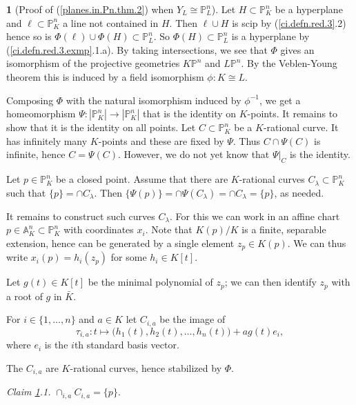 \documentclass{amsart}
\theoremstyle{definition}
\newtheorem{say}[thm]{}
\theoremstyle{remark}
\renewcommand{\a}[0]{{\mathbb A}}
\newcommand{\p}[0]{{\mathbb P}}
\begin{document}
\begin{say}[Proof of (\ref{planes.in.Pn.thm.2}) when $Y_L\cong \p^n_L$]\label{planes.in.Pn.thm.pf.1} Let $H\subset \p^n_K$ be a hyperplane and
 $\ell\subset \p^n_K$  a line not contained in $H$. Then
$\ell\cup H$ is scip by (\ref{ci.defn.red.3}.2) hence
so is $\Phi(\ell)\cup \Phi(H)\subset \p^n_L$. So 
$\Phi(H)\subset \p^n_L$ is a hyperplane
by (\ref{ci.defn.red.3.exmp}.1.a). By taking intersections, we see that
$\Phi$ gives an isomorphism of the projective geometries
$K\p^n$ and $L\p^n$. By  the Veblen-Young theorem \cite{MR1506049}
this is induced by a field  isomorphism $\phi:K\cong L$.


Composing $\Phi$ with the natural isomorphism induced by $\phi^{-1}$,
we get a homeomorphism $\Psi:|\p^n_K|\to |\p^n_K|$ that is the identity on $K$-points. It remains to show that it is the identity on all points. 
Let $C\subset \p^n_K$ be a $K$-rational curve. It has infinitely many $K$-points and these are fixed by $\Psi$.   Thus $C\cap \Psi(C)$ is infinite, hence
$C=\Psi(C)$. However, we do not yet know that $\Psi|_C$ is the identity.





Let $p\in \p^n_K$ be a closed point.  Assume that there are $K$-rational curves $C_{\lambda}\subset \p^n_K$ such that $\{p\}=\cap C_{\lambda}$. 
Then
$\{\Psi(p)\}=\cap \Psi(C_{\lambda})=\cap C_{\lambda}=\{p\}$,
as needed. 

It remains to construct such curves $C_{\lambda}$. For this we can work in an affine chart  $p\in \a^n_K\subset \p^n_K$ with coordinates $x_i$.
Note that  $K(p)/K$ is a finite, separable extension, hence can be generated by a single element $z_p\in K(p)$. 
We can thus write
$x_i(p)=h_i(z_p)$ for some  $h_i\in K[t]$.

Let  $g(t)\in K[t]$ be the  minimal polynomial of $z_p$; we can then identify $z_p$ with a root of $g$ in $\bar K$.



For $i\in \{1,\dots, n\}$  and $a\in K$ let $C_{i,a}$ be the image of
$$
\tau_{i,a}:t\mapsto   \bigl(h_1(t), h_2(t),\dots, h_n(t)\bigr)+ ag(t)e_i,
$$
where $e_i$ is the $i$th standard basis vector.

The $C_{i,a}$ are $K$-rational curves, hence stabilized by $\Phi$. 

\medskip
{\it Claim \ref{planes.in.Pn.thm.pf.1}.1.}  $\cap_{i,a} C_{i,a}=\{p\}$.   
\medskip


\end{say}
\end{document}

